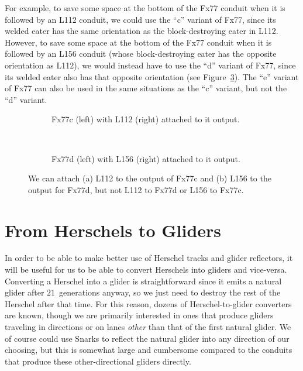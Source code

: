 For example, to save some space at the bottom of the Fx77 conduit when it is followed by an L112 conduit, we could use the ``c'' variant of Fx77, since its welded eater has the same orientation as the block-destroying eater in L112. However, to save some space at the bottom of the Fx77 conduit when it is followed by an L156 conduit (whose block-destroying eater has the opposite orientation as L112), we would instead have to use the ``d'' variant of Fx77, since its welded eater also has that opposite orientation (see Figure~\ref{fig:fx77_variants_with_l}). The ``e'' variant of Fx77 can also be used in the same situations as the ``c'' variant, but not the ``d'' variant.

\begin{figure}[!htb]
	\centering
	\begin{subfigure}{.5\textwidth}
		\centering
		\caption{Fx77c (left) with L112 (right) attached to it output.}
		\label{fig:fx77c_l112}
	\end{subfigure}\ \ \ \ %
	\begin{subfigure}{.47\textwidth}
		\centering
		\caption{Fx77d (left) with L156 (right) attached to it output.}
		\label{fig:fx77d_l156}
	\end{subfigure}
	\caption{We can attach (a) L112 to the output of Fx77c and (b) L156 to the output for Fx77d, but not L112 to Fx77d or L156 to Fx77c.}\label{fig:fx77_variants_with_l}
\end{figure}


\section{From Herschels to Gliders}\label{sec:herschels_to_gliders}

In order to be able to make better use of Herschel tracks and glider reflectors, it will be useful for us to be able to convert Herschels into gliders and vice-versa. Converting a Herschel into a glider is straightforward since it emits a natural glider after $21$~generations anyway, so we just need to destroy the rest of the Herschel after that time. For this reason, dozens of Herschel-to-glider converters are known, though we are primarily interested in ones that produce gliders traveling in directions or on lanes \emph{other} than that of the first natural glider. We of course could use Snarks to reflect the natural glider into any direction of our choosing, but this is somewhat large and cumbersome compared to the conduits that produce these other-directional gliders directly.

